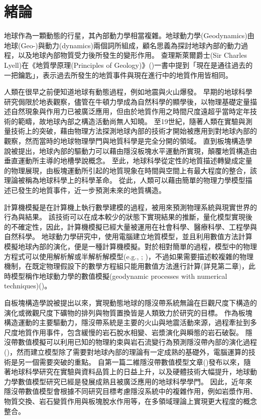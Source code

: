 
\chapter{緒論}

地球作為一顆動態的行星，其內部動力學相當複雜。地球動力學(Geodynamics)由地球(Geo-)與動力(dynamics)兩個詞所組成，顧名思義為探討地球內部的動力過程，以及地球內部物質受力後所發生的變形作用。
查理斯萊爾爵士(Sir Charles Lyell)在《地質學原理(Principles of Geology)》(\citealp{lyell1837principles})一書中提到「現在是通往過去的一把鑰匙」，表示過去所發生的地質事件與現在進行中的地質作用皆相同。

人類在很早之前便知道地球有動態過程，例如地震與火山爆發。
早期的地球科學研究侷限於地表觀察，儘管在牛頓力學成為自然科學的顯學後，以物理基礎定量描述自然現象與作用力已被廣泛應用，但由於地質作用之時間尺度遠超乎當時定年技術的範疇，故地球內部之構造活動尚無人知曉。
至19世紀，隨著人類在實驗與測量技術上的突破，藉由物理方法探測地球內部的技術才開始被應用到對地球內部的觀察，然而當時的地球物理學門與地質科學是完全分開的領域。
直到板塊構造學說被提出，地球內部的驅動力可以藉由隱沒板塊水平運動所實現，顛覆地質構造由垂直運動所主導的地槽學說概念。
至此，地球科學從定性的地質描述轉變成定量的物理展現，由板塊運動所引起的地質現象在時間與空間上有最大程度的整合，該理論被稱為地球科學上的科學革命。
從此，人類可以藉由簡單的物理力學模型描述已發生的地質事件，近一步預測未來的地質構造。

計算機模擬是在計算機上執行數學建模的過程，被用來預測物理系統與現實世界的行為與結果。
該技術可以在成本較少的狀態下實現結果的推斷，量化模型實現後的不確定性，因此，計算機模擬已經大量被運用在社會科學、醫療科學、工程學與自然科學。
地球動力學研究中，使用電腦建立地質模型，並且利用數值方法計算模擬地球內部的演化，便是一種計算機模擬。對於相對簡單的過程，模型中的物理方程式可以使用解析解或半解析解模型(e.g., \citealp{samuel2006oscillating}; \citealp{montesi2007mantle})，不過如果需要描述較複雜的物理機制，在既定物理假設下的數學方程組只能用數值方法進行計算(詳見第二章)，此時模型稱作地球動力學的數值模擬(geodynamic processes with numerical techniques)(\citealp{101Geodynamics})。

自板塊構造學說被提出以來，實現動態地球的隱沒帶系統無論在巨觀尺度下構造的演化或微觀尺度下礦物的排列與物質置換皆是人類致力於研究的目標。
作為板塊構造運動的主要驅動力，隱沒帶系統是主要的火山與地震活動來源，過程牽扯到多尺度地質作用事件，包含緩慢的岩石脫水相變、岩漿演化與瞬態的岩石破裂。
隱沒帶數值模擬可以利用已知的物理約束與岩石流變行為預測隱沒帶內部的演化過程(\citealp{Gerya2011})，然而建立模型除了需要對地球內部的理論有一定成熟的基礎外，電腦運算的技術是另一個需要突破的重點。
自第一篇二維隱沒帶數值模型文章(\citealp{minear1970thermal})發布以來，隨著地球科學研究在實驗與資料品質上的日益上升，以及硬體技術大幅提升，地球動力學數值模型研究已經是發展成熟且被廣泛應用的地球科學學門。
因此，近年來隱沒帶數值模型會根據不同研究目標考慮隱沒系統中的複雜作用，例如岩漿作用、物質交換、岩石變質作用與板塊脫水作用等，在多領域理論上實現更大程度的概念整合。

